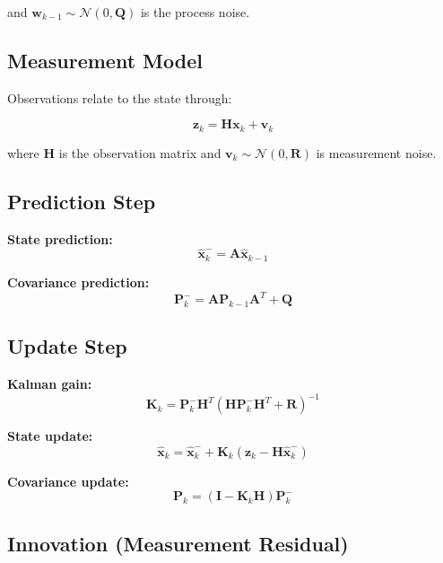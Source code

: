 \documentclass[12pt,a4paper]{report}
\begin{document}
and $\mathbf{w}_{k-1} \sim \mathcal{N}(0, \mathbf{Q})$ is the process noise.

\subsection{Measurement Model}

Observations relate to the state through:

\begin{equation}
\mathbf{z}_k = \mathbf{H} \mathbf{x}_k + \mathbf{v}_k
\end{equation}

where $\mathbf{H}$ is the observation matrix and $\mathbf{v}_k \sim \mathcal{N}(0, \mathbf{R})$ is measurement noise.

\subsection{Prediction Step}

\textbf{State prediction:}
\begin{equation}
\hat{\mathbf{x}}_k^{-} = \mathbf{A} \hat{\mathbf{x}}_{k-1}
\end{equation}

\textbf{Covariance prediction:}
\begin{equation}
\mathbf{P}_k^{-} = \mathbf{A} \mathbf{P}_{k-1} \mathbf{A}^T + \mathbf{Q}
\end{equation}

\subsection{Update Step}

\textbf{Kalman gain:}
\begin{equation}
\mathbf{K}_k = \mathbf{P}_k^{-} \mathbf{H}^T (\mathbf{H} \mathbf{P}_k^{-} \mathbf{H}^T + \mathbf{R})^{-1}
\end{equation}

\textbf{State update:}
\begin{equation}
\hat{\mathbf{x}}_k = \hat{\mathbf{x}}_k^{-} + \mathbf{K}_k (\mathbf{z}_k - \mathbf{H} \hat{\mathbf{x}}_k^{-})
\end{equation}

\textbf{Covariance update:}
\begin{equation}
\mathbf{P}_k = (\mathbf{I} - \mathbf{K}_k \mathbf{H}) \mathbf{P}_k^{-}
\end{equation}

\subsection{Innovation (Measurement Residual)}
\end{document}
